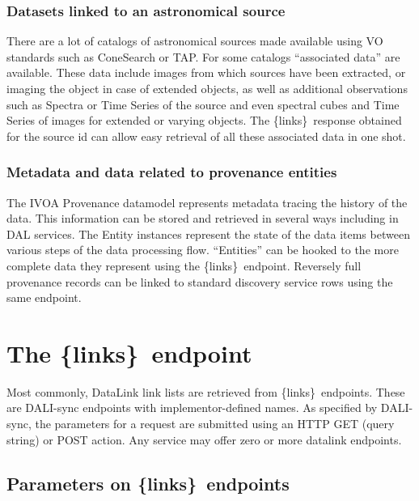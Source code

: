 \documentclass[11pt,a4paper]{ivoa}
\newcommand{\blinks}{\{links\}}
\begin{document}
\subsubsection{Datasets linked to an astronomical source}
\label{sec:useSource}

There are  a lot of catalogs of astronomical sources made available
using VO standards such as ConeSearch \citep{2008ivoa.specQ0222P} or
TAP.  For some catalogs ``associated data'' are available. These
data include images from which sources have been extracted, or imaging the
object in  case of extended objects, as well as additional observations
such as Spectra or Time Series of the source and even spectral cubes
and Time Series of images for extended or varying objects. The \blinks\
response obtained for the source id can allow easy retrieval of all
these associated data in one shot.

\subsubsection{Metadata and data related to provenance entities}
\label{sec:useProvenance}

The IVOA Provenance datamodel \citep{pr:provdm} represents metadata
tracing  the history of the data. This information can be stored and retrieved
in several ways including  in DAL services.
The Entity instances represent  the state of the data items between
various steps of the data processing flow. ``Entities'' can be hooked
to the more complete data they represent using the \blinks\ endpoint.
Reversely full provenance records can be linked to standard discovery 
service rows using the same endpoint.

\section{The \blinks\ endpoint}

\label{sec:linksEndpoint}

Most commonly, DataLink link lists are retrieved from \blinks\ endpoints.
These are DALI-sync endpoints with implementor-defined names.
As specified by DALI-sync, the parameters for a request are submitted
using an HTTP GET (query string) or POST action.  Any service may offer
zero or more datalink endpoints.

\subsection{Parameters on \blinks\ endpoints}
\end{document}
